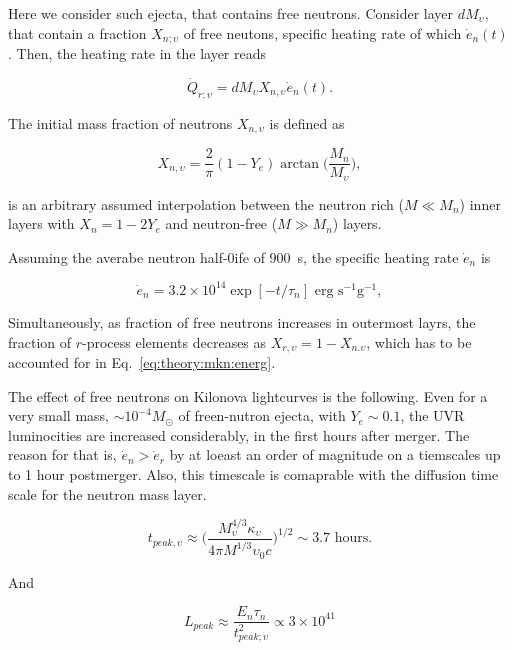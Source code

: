 \documentclass[11pt,a4paper,headinclude=true,DIV=14,BCOR=8mm,chapterprefix,listof=totoc,twoside,openright,abstracton]{scrbook}
\begin{document}
Here we consider such ejecta, that contains free neutrons. 
Consider layer $dM_{\upsilon}$, that contain a fraction $X_{n;\upsilon}$ of free neutons, specific heating rate of which $\dot{e}_n(t)$. Then, the heating rate in the layer reads 

\begin{equation}
    \dot{Q}_{r;\upsilon} = dM_{\upsilon} X_{n,\upsilon}\dot{e}_n(t).
\end{equation}

The initial mass fraction of neutrons $X_{n,\upsilon}$ is defined as 

\begin{equation}
    X_{n,\upsilon} = \frac{2}{\pi}(1 - Y_e)\arctan\Big(\frac{M_{n}}{M_{\upsilon}}\Big),
\end{equation}

is an arbitrary assumed interpolation between the neutron rich ($M\ll M_{n}$) inner layers with $X_{n} = 1-2Y_e$ and neutron-free ($M\gg M_n$) layers.

Assuming the averabe neutron half-0ife of $900$~s, the specific heating rate $\dot{e}_{n}$ is 

\begin{equation}
    \dot{e}_n = 3.2 \times 10^{14} \exp[-t/\tau_n] \text{ erg } \text{s}^{-1} \text{g}^{-1},
\end{equation}

Simultaneously, as fraction of free neutrons increases in outermost layrs, the fraction of $r$-process elements decreases as $X_{r,\upsilon} = 1 - X_{n.\upsilon}$, which has to be accounted for in Eq.~\eqref{eq:theory:mkn:energ}.

The effect of free neutrons on Kilonova lightcurves is the following.
Even for a very small mass, $\sim 10^{-4}M_{\odot}$ of freen-nutron ejecta, with $Y_e\sim0.1$, the UVR luminocities are increased considerably, in the first hours after merger.
The reason for that is, $\dot{e}_{n} > \dot{e}_r$ by at loeast an order of magnitude on a tiemscales up to 1 hour postmerger. Also, this timescale is comaprable with the diffusion time scale for the neutron mass layer. 

\begin{equation}
    t_{peak,\upsilon} \approx \Bigg(\frac{M_{\upsilon}^{4/3}\kappa_{\upsilon}}{4\pi M^{1/3}\upsilon_0 c}\Bigg)^{1/2} \sim 3.7 \text{ hours}.
\end{equation}

And 

\begin{equation}
    L_{peak} \approx \frac{E_n \tau_n}{t_{peak;\upsilon}^2} \propto 3\times10^{41}
\end{equation}
\end{document}
